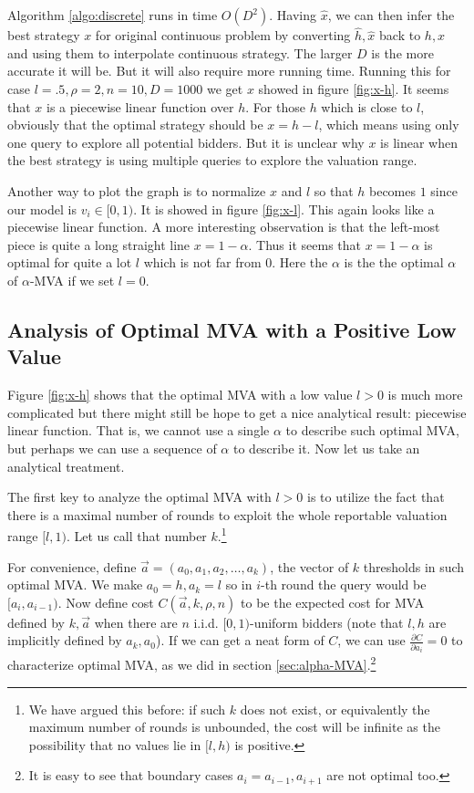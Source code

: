 Algorithm \ref{algo:discrete} runs in time $O(D^2)$. Having $\hat x$, we can
then infer the best strategy $x$ for original continuous problem by converting
$\hat h, \hat x$ back to $h, x$ and using them to interpolate continuous
strategy.  The larger $D$ is the more accurate it will be. But it will also
require more running time.  Running this for case $l = .5, \rho = 2, n = 10, D
= 1000$ we get $x$ showed in figure \ref{fig:x-h}. It seems that $x$ is a
piecewise linear function over $h$.  For those $h$ which is close to
$l$, obviously that the optimal strategy should be $x = h - l$,
which means using only one query to explore all potential bidders. But it is
unclear why $x$ is linear when the best strategy is using multiple queries to
explore the valuation range.

Another way to plot the graph is to normalize $x$ and $l$ so that $h$ becomes
$1$ since our model is $v_i \in [0, 1)$. It is showed in figure \ref{fig:x-l}.
This again looks like a piecewise linear function.  A more interesting
observation is that the left-most piece is quite a long straight line $x =
1-\alpha$. Thus it seems that $x = 1-\alpha$ is optimal for quite a lot $l$ which is not
far from $0$. Here the $\alpha$ is the the optimal $\alpha$ of $\alpha$-MVA if
we set $l = 0$.

\subsection{Analysis of Optimal MVA with a Positive Low Value}\label{sec:general_analysis}

Figure \ref{fig:x-h} shows that the optimal MVA with a low value $l > 0$ is
much more complicated but there might still be hope to get a nice analytical
result: piecewise linear function. That is, we cannot use a single $\alpha$ to
describe such optimal MVA, but perhaps we can use a sequence of $\alpha$ to
describe it. Now let us take an analytical treatment.

The first key to analyze the optimal MVA with $l > 0$ is to utilize
the fact that there is a maximal number of rounds to exploit the whole
reportable valuation range $[l, 1)$. Let us call that
number $k$.\footnote{We have argued this before: if such $k$ does not exist, or equivalently
the maximum number of rounds is unbounded, the cost will be infinite as the possibility that no
values lie in $[l, h)$ is positive.}

For convenience, define $\vec a = (a_0, a_1, a_2, \ldots, a_k)$, the vector of
$k$ thresholds in such optimal MVA. We make $a_0 = h, a_k = l$ so in $i$-th
round the query would be $[a_i, a_{i-1})$. Now define cost $C(\vec a, k, \rho,
n)$ to be the expected cost for MVA defined by $k, \vec a$ when there are $n$
i.i.d.  $[0, 1)$-uniform bidders (note that $l, h$ are implicitly defined by
$a_k, a_0$). If we can get a neat form of $C$, we can use $\frac{\partial
C}{\partial a_i} = 0 $ to characterize optimal MVA, as we did in section
\ref{sec:alpha-MVA}.\footnote{It is easy to see that boundary cases $a_i = a_{i-1},
a_{i+1}$ are not optimal too.}

